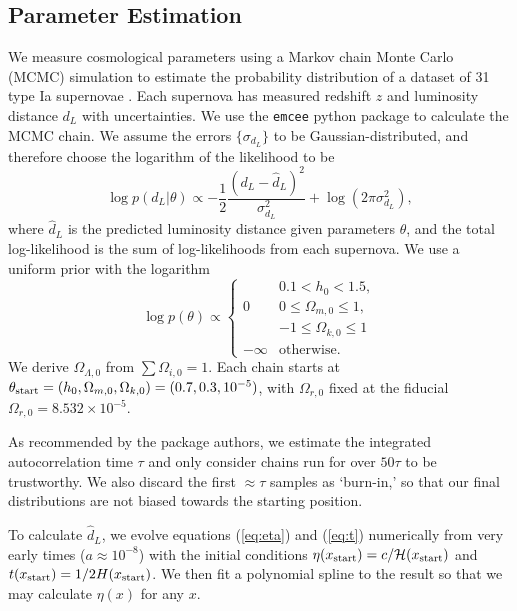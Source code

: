 \documentclass[aps,prl,twocolumn,groupedaddress,nofootinbib]{revtex4-2}
\newcommand{\Oio}{\Omega_{i,0}}
\newcommand{\Omo}{\Omega_{m,0}}
\newcommand{\Oro}{\Omega_{r,0}}
\newcommand{\Oko}{\Omega_{k,0}}
\newcommand{\Olo}{\Omega_{\Lambda,0}}
\newcommand{\Hp}{\mathcal{H}}
\begin{document}
\subsection{Parameter Estimation}
We measure cosmological parameters using a Markov chain Monte Carlo (MCMC) simulation to estimate the probability distribution of a dataset of 31 type Ia supernovae \cite{betoule_improved_2014}. Each supernova has measured redshift $z$ and luminosity distance $d_L$ with uncertainties. We use the \verb|emcee| python package \cite{foreman-mackey_emcee_2013} to calculate the MCMC chain. We assume the errors $\{\sigma_{d_L}\}$ to be Gaussian-distributed, and therefore choose the logarithm of the likelihood to be
\begin{equation}
    \label{eq:log_likely}
    \log p(d_L|\theta)\propto-\frac{1}{2}\frac{(d_{L} - \hat{d}_{L})^2}{\sigma_{d_L}^2}
    + \log(2\pi \sigma_{d_L}^2),
\end{equation}
where $\hat{d}_L$ is the predicted luminosity distance given parameters $\theta$, and the total log-likelihood is the sum of log-likelihoods from each supernova. We use a uniform prior with the logarithm
\begin{equation}
    \label{eq:log_prior}
    \log p(\theta)\propto
    \begin{cases}
                & 0.1 < h_0 < 1.5,    \\
        0       & 0 \leq \Omo \leq 1, \\
                & -1 \leq \Oko \leq 1 \\
        -\infty & \text{otherwise.}
    \end{cases}
\end{equation}
We derive $\Olo$ from $\sum\Oio=1$. Each chain starts at $\theta_{\rm start}=(h_0,\Omo,\Oko)=(0.7,0.3,10^{-5})$, with $\Oro$ fixed at the fiducial $\Oro = 8.532\times 10^{-5}$.

As recommended by the package authors, we estimate the integrated autocorrelation time $\tau$ and only consider chains run for over $50\tau$ to be trustworthy. We also discard the first $\approx\tau$ samples as `burn-in,' so that our final distributions are not biased towards the starting position.

To calculate $\hat{d}_L$, we evolve equations (\ref{eq:eta}) and (\ref{eq:t}) numerically from very early times ($a\approx10^{-8}$) with the initial conditions $\eta(x_{\rm start})=c/\Hp(x_{\rm start})$ and $t(x_{\rm start})=1/2H(x_{\rm start})$. We then fit a polynomial spline to the result so that we may calculate $\eta(x)$ for any $x$.
\end{document}
